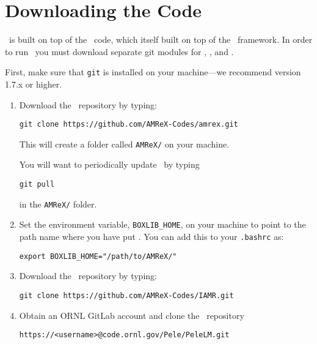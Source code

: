 
\section{Downloading the Code}

\pelelm\ is built on top of the \iamr\ code, which itself built on top of the \amrex\ framework.  In order to run
\pelelm\, you must download separate git modules for \pelelm, \iamr, and \amrex.

\vspace{.1in}

\noindent First, make sure that {\tt git} is installed on your machine---we recommend version 1.7.x or higher.

\vspace{.1in}

\begin{enumerate}

\item Download the \amrex\ repository by typing: 
\begin{verbatim}
git clone https://github.com/AMReX-Codes/amrex.git
\end{verbatim}

This will create a folder called {\tt AMReX/} on your machine.

You will want to periodically update \amrex\ by typing
\begin{verbatim}
git pull
\end{verbatim}
in the {\tt AMReX/} folder.  

\item Set the environment variable, {\tt BOXLIB\_HOME}, on your
  machine to point to the path name where you have put \amrex.
  You can add this to your {\tt .bashrc} as:
\begin{verbatim}
export BOXLIB_HOME="/path/to/AMReX/"
\end{verbatim}


\item Download the \iamr\ repository by typing: 
\begin{verbatim}
git clone https://github.com/AMReX-Codes/IAMR.git
\end{verbatim}

\item Obtain an ORNL GitLab account and clone the \pelelm\ repository
\begin{verbatim}
https://<username>@code.ornl.gov/Pele/PeleLM.git
\end{verbatim}

\end{enumerate}

